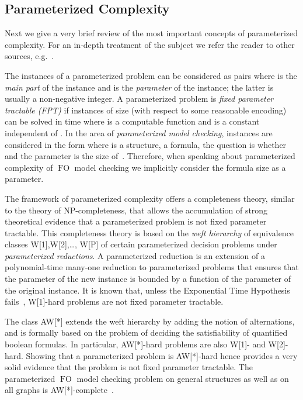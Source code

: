 \documentclass{CSML}
\newcommand{\FO}{\ensuremath{\operatorname{FO}}\xspace}
\theoremstyle{plain}\newtheorem{claim}[thm]{Claim}
\begin{document}
\subsection{Parameterized Complexity}\label{section:pc}

Next we give a very brief review of the most important
concepts of parameterized complexity. For an in-depth treatment of the
subject we refer the reader to other sources, e.g.~\cite{df13}.

The instances of a parameterized problem can be considered as pairs
 where  is the \emph{main part} of the instance and  is
the \emph{parameter} of the instance; the latter is usually a
non-negative integer.  A parameterized problem is
\emph{fixed parameter tractable (FPT)} if instances  
of size  (with respect to some reasonable encoding) can be solved
in time  where  is a computable function and 
is a constant independent of .
In the area of {\em parameterized model checking}, instances are
considered in the form 
where  is a structure,  a formula, the question is whether
 and the parameter is the size of~.
Therefore, when speaking about parameterized complexity
of \FO model checking we implicitly consider the formula size as a parameter.

The framework of parameterized complexity offers a
completeness theory, similar to the theory of NP-completeness, 
that allows the accumulation of strong theoretical
evidence that a parameterized problem is not fixed parameter
tractable.  This completeness theory is based on the \emph{weft
  hierarchy} of equivalence classes W[1],W[2],\dots, W[P] of
certain parameterized decision problems under \emph{parameterized
  reductions}. A parameterized reduction is an
extension of a polynomial-time many-one reduction 
to parameterized problems that ensures that the parameter of the new instance
is bounded by a function of the parameter of the original instance.
It is known that, unless the Exponential Time Hypothesis fails~\cite{ipz01},
W[1]-hard problems are not fixed parameter tractable.

The class AW[*] extends the weft hierarchy by adding the notion of
alternations, and is formally based on the problem of deciding the
satisfiability of quantified boolean formulas. 
In particular, AW[*]-hard problems are also W[1]- and W[2]-hard.
Showing that a parameterized problem is AW[*]-hard hence provides
a very solid evidence that the problem is not fixed parameter tractable.
The parameterized \FO model checking problem on general structures 
as well as on all graphs is AW[*]-complete~\cite{dft96}.
\end{document}
